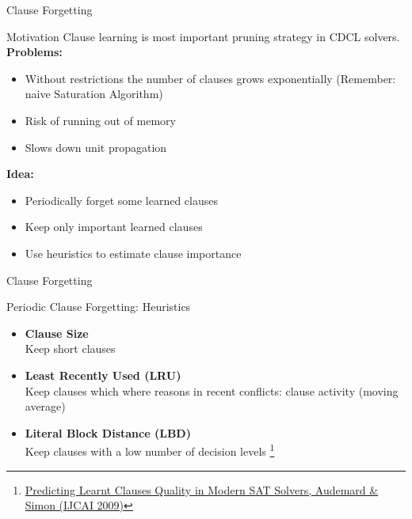 \documentclass[t]{sdqbeamer}
\begin{document}
\begin{frame}{Clause Forgetting}

\begin{block}{Motivation}
Clause learning is most important pruning strategy in CDCL solvers.\\[1ex]
\textbf{Problems:}
\begin{itemize}
\item Without restrictions the number of clauses grows exponentially (Remember: naive Saturation Algorithm)
\item Risk of running out of memory
\item Slows down unit propagation
\end{itemize}
\textbf{Idea:}
\begin{itemize}
\item Periodically forget some learned clauses
\item Keep only important learned clauses
\item Use heuristics to estimate clause importance
\end{itemize}
\end{block}
\end{frame}

\begin{frame}{Clause Forgetting}
\begin{block}{Periodic Clause Forgetting: Heuristics}
\begin{itemize}\setlength{\itemsep}{1em}
    \item \textbf{Clause Size}\\[1ex]
    Keep short clauses
    \item \textbf{Least Recently Used (LRU)}\\[1ex]
    Keep clauses which where reasons in recent conflicts: clause activity (moving average)
    \item \textbf{Literal Block Distance (LBD)}\\[1ex]
    Keep clauses with a low number of decision levels%
    \footnote{\href{https://www.ijcai.org/Proceedings/09/Papers/074.pdf}{Predicting Learnt Clauses Quality in Modern SAT Solvers, Audemard \& Simon (IJCAI 2009)}}
\end{itemize}
\end{block}
\end{frame}
    
\end{document}
